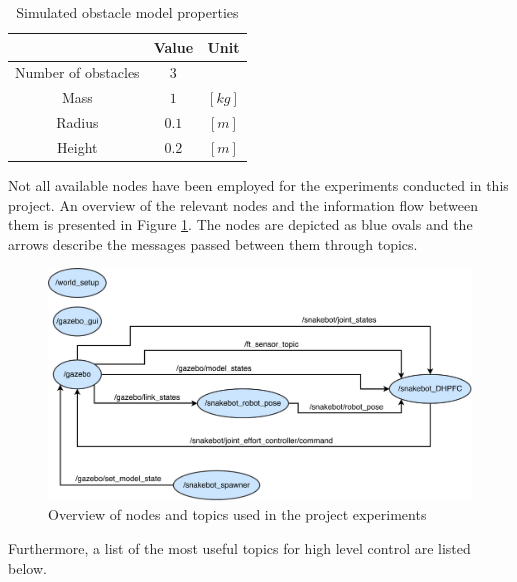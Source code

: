 \begin{table}
    \centering
    \begin{tabular}{|c|c|c|}
        \hline
        & Value & Unit\\
        \hline
        Number of obstacles & $3$ & \\
        Mass & $1$ & $[kg]$ \\
        Radius & $0.1$ & $[m]$ \\
        Height & $0.2$ & $[m]$ \\
        \hline
    \end{tabular}
    \caption{Simulated obstacle model properties}
    \label{tab:obst_model_props}
\end{table}

Not all available nodes have been employed for the experiments conducted in this project. An overview of the relevant nodes and the information flow between them is presented in Figure \ref{fig:proj_nodes}. The nodes are depicted as blue ovals and the arrows describe the messages passed between them through topics.

\begin{figure}
    \centering
    \includegraphics[width=1\textwidth]{figures/simulator/proj_nodes.pdf}
    \caption{Overview of nodes and topics used in the project experiments}
    \label{fig:proj_nodes}
\end{figure}

Furthermore, a list of the most useful topics for high level control are listed below.

